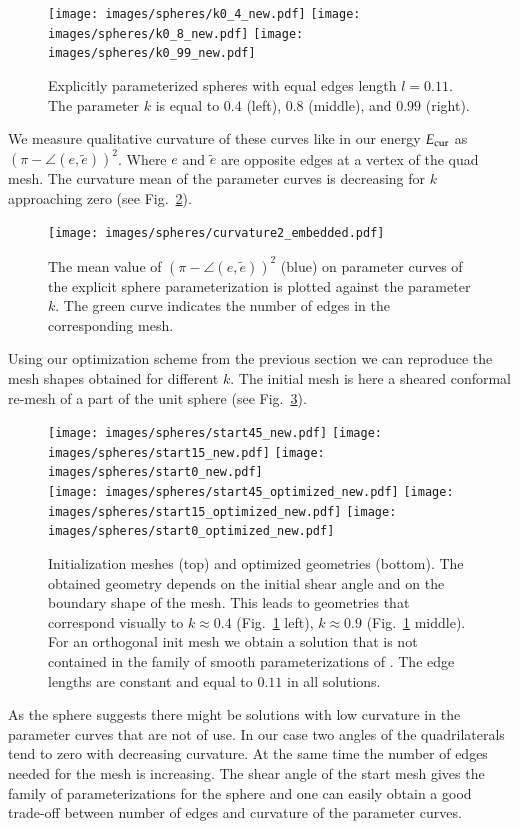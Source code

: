 \documentclass[Thesis.tex]{subfiles}
\begin{document}
\begin{figure}
\centering
\texttt{[image: images/spheres/k0\_4\_new.pdf]}
\texttt{[image: images/spheres/k0\_8\_new.pdf]}
\texttt{[image: images/spheres/k0\_99\_new.pdf]}
\caption{Explicitly parameterized spheres with equal edges length $l=0.11$. The parameter $k$ is equal to $0.4$ (left), $0.8$ (middle), and $0.99$ (right).}
\label{fig:spheres}
\end{figure}

We measure qualitative curvature of these curves like in our energy $E_{\textrm{\scriptsize{cur}}}$ as $(\pi - \angle(e,\tilde e))^2$. Where $e$ and $\tilde e$ are opposite edges at a vertex of the quad mesh. The curvature mean of the parameter curves is decreasing for $k$ approaching zero (see Fig.~\ref{fig:curvature_plot}).
\begin{figure}
\centering
\texttt{[image: images/spheres/curvature2\_embedded.pdf]}
\caption{The mean value of $(\pi - \angle(e,\tilde e))^2$ (blue) on parameter curves of the explicit sphere parameterization is plotted against the parameter $k$. The green curve indicates the number of edges in the corresponding mesh.}
\label{fig:curvature_plot}
\end{figure}
Using our optimization scheme from the previous section we can reproduce the mesh shapes obtained for different $k$. The initial mesh is here a sheared conformal re-mesh of a part of the unit sphere (see Fig.~\ref{fig:spheres_optimized}).
\begin{figure}
\centering
\texttt{[image: images/spheres/start45\_new.pdf]}
\texttt{[image: images/spheres/start15\_new.pdf]}
\texttt{[image: images/spheres/start0\_new.pdf]}\\
\texttt{[image: images/spheres/start45\_optimized\_new.pdf]}
\texttt{[image: images/spheres/start15\_optimized\_new.pdf]}
\texttt{[image: images/spheres/start0\_optimized\_new.pdf]}
\caption{Initialization meshes (top) and optimized geometries (bottom). The obtained geometry depends on the initial shear angle and on the boundary shape of the mesh. This leads to geometries that correspond visually to $k\approx 0.4$ (Fig.~\ref{fig:spheres} left), $k\approx 0.9$ (Fig.~\ref{fig:spheres} middle). For an orthogonal init mesh we obtain a solution that is not contained in the family of smooth parameterizations of \cite{Voss1881}. The edge lengths are constant and equal to $0.11$ in all solutions.}
\label{fig:spheres_optimized}
\end{figure}
As the sphere suggests there might be solutions with low curvature in the parameter curves that are not of use. In our case two angles of the quadrilaterals tend to zero with decreasing curvature. At the same time the number of edges needed for the mesh is increasing. The shear angle of the start mesh gives the family of parameterizations for the sphere and one can easily obtain a good trade-off between number of edges and curvature of the parameter curves.
\end{document}

